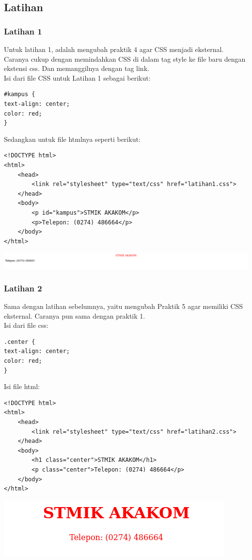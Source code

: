 \documentclass[a4paper,12pt]{article}
\begin{document}
\newpage

\subsection{Latihan}
\subsubsection{Latihan 1}
Untuk latihan 1, adalah mengubah praktik 4 agar CSS menjadi eksternal. Caranya cukup dengan 
memindahkan CSS di dalam tag style ke file baru dengan ekstensi css. Dan memanggilnya 
dengan tag link.\\
Isi dari file CSS untuk Latihan 1 sebagai berikut:
\begin{lstlisting}
#kampus {
text-align: center;
color: red;
}
\end{lstlisting}
Sedangkan untuk file htmlnya seperti berikut:
\begin{lstlisting}
<!DOCTYPE html>
<html>
    <head>
        <link rel="stylesheet" type="text/css" href="latihan1.css">
    </head>
    <body>
        <p id="kampus">STMIK AKAKOM</p>
        <p>Telepon: (0274) 486664</p>
    </body>
</html>
\end{lstlisting}
\begin{center}
    \includegraphics[scale=0.4]{4.png}
\end{center}

\subsubsection{Latihan 2}
Sama dengan latihan sebelumnya, yaitu mengubah Praktik 5 agar memiliki CSS eksternal. Caranya 
pun sama dengan praktik 1.\\
Isi dari file css:
\begin{lstlisting}
.center {
text-align: center;
color: red;
}
\end{lstlisting}
Isi file html:
\begin{lstlisting}
<!DOCTYPE html>
<html>
    <head>
        <link rel="stylesheet" type="text/css" href="latihan2.css">
    </head>
    <body>
        <h1 class="center">STMIK AKAKOM</h1>
        <p class="center">Telepon: (0274) 486664</p>
    </body>
</html>
\end{lstlisting}
\begin{center}
    \includegraphics[width=\linewidth]{5.png}
\end{center}
\end{document}
